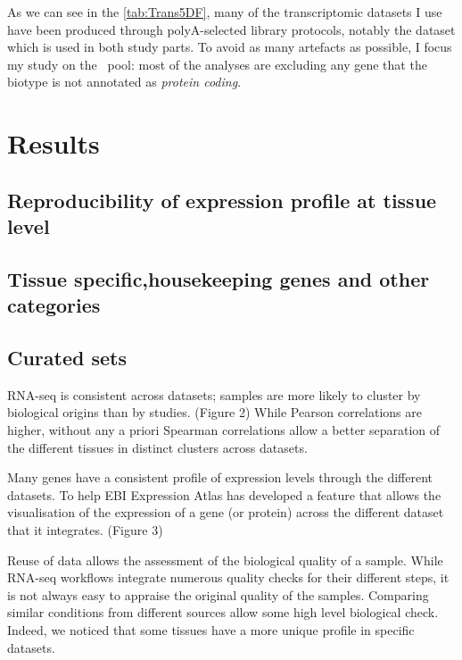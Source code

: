 As we can see in the \cref{tab:Trans5DF}, many of the transcriptomic datasets I
use have been produced through
polyA-selected library protocols, notably the  dataset which is
used in both study parts.
To avoid as many artefacts as possible, I
focus my study on the \mRNAs\ pool: most of the analyses are excluding
any gene that the biotype is not annotated as \emph{protein coding}.


\section{Results}\label{sec:Trans_Results}

\subsection{Reproducibility of expression profile at tissue level}\label{subsec:Trans_ReproExpresTissue}


\subsection{Tissue specific,housekeeping genes and other categories}\label{subsec:Trans_TissueSpeAndHK}

\subsection{Curated sets}\label{subsec:Trans_curatedSets}


RNA-seq is consistent across datasets; samples are more likely to cluster by
biological origins than by studies. (Figure 2)
While Pearson correlations are higher, without any a priori Spearman correlations
allow a better separation of the different tissues in distinct clusters across
datasets.

Many genes have a consistent profile of expression levels through the different
datasets.
To help EBI Expression Atlas has developed a feature that allows the visualisation
of the expression of a gene (or protein) across the different dataset that it
integrates. (Figure 3)

Reuse of data allows the assessment of the biological quality of a sample.
While RNA-seq workflows integrate numerous quality checks for their different steps,
it is not always easy to appraise the original quality of the samples. Comparing
similar conditions from different sources allow some high level biological check.
Indeed, we noticed that some tissues have a more unique profile in specific
datasets.


